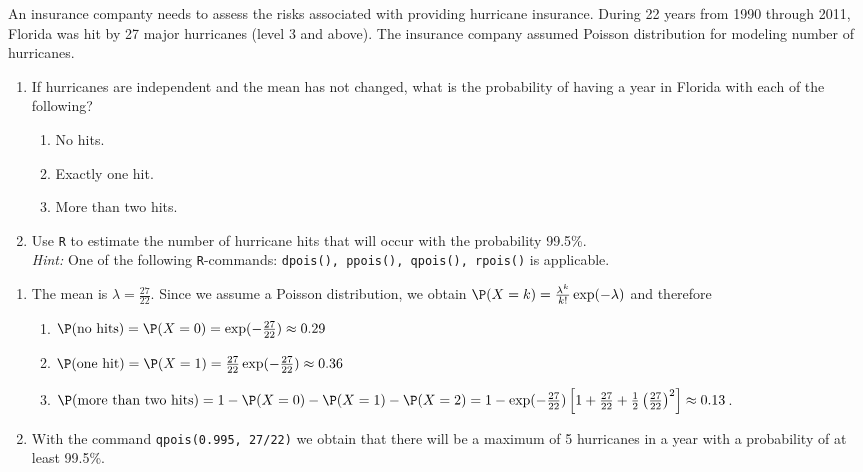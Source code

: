 
\begin{exercise}

An insurance companty needs to assess the risks associated with providing hurricane
insurance. During 22 years from 1990 through 2011, Florida was hit by 27 major
hurricanes (level 3 and above). The insurance company assumed Poisson distribution
for modeling number of hurricanes.

\begin{enumerate}[label = (\alph*)]
  \item If hurricanes are independent and the mean has not changed, what is the
  probability of having a year in Florida with each of the following?
  \begin{enumerate}[label = (\arabic*)]
    \item No hits.
    \item Exactly one hit.
    \item More than two hits.
  \end{enumerate}
  \item Use \texttt{R} to estimate the number of hurricane hits that will occur
  with the probability 99.5\%. \\
  \textit{Hint:} One of the following \texttt{R}-commands: \texttt{dpois(), ppois(), qpois(), rpois()}
  is applicable.
\end{enumerate}

\end{exercise}


\begin{solution}

\phantom{}

\begin{enumerate}[label = (\alph*)]
  \item The mean is $\lambda = \frac{27}{22}$. Since we assume a Poisson distribution,
  we obtain $\P(X = k) = \frac{\lambda^k}{k!}\exp(-\lambda)$ and therefore
  \begin{enumerate}[label = (\arabic*)]
    \item $\P(\text{no hits}) = \P(X = 0) = \exp(-\frac{27}{22}) \approx 0.29$
    \item $\P(\text{one hit}) = \P(X = 1) = \frac{27}{22}\exp(-\frac{27}{22}) \approx 0.36$
    \item $\P(\text{more than two hits}) = 1 - \P(X = 0) - \P(X = 1) - \P(X = 2)
    = 1 - \exp(-\frac{27}{22})\left[1 + \frac{27}{22} + \frac{1}{2}\left(\frac{27}{22}\right)^2\right]
    \approx 0.13$.
  \end{enumerate}
  \item With the command \texttt{qpois(0.995, 27/22)} we obtain that there will
  be a maximum of 5 hurricanes in a year with a probability of at least 99.5\%.
\end{enumerate}

\end{solution}

